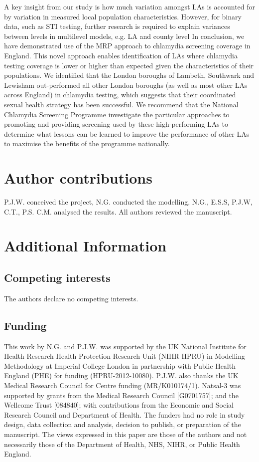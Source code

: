 \documentclass[fleqn,10pt]{wlscirep}
\begin{document}
A key insight from our study is how much variation amongst LAs is accounted for by variation in measured local population characteristics. However, for binary data, such as STI testing, further research is required to explain variances between levels in multilevel models, e.g. LA and county level \cite{Gelman2006}
In conclusion, we have demonstrated use of the MRP approach to chlamydia screening coverage in England. This novel approach enables identification of LAs where chlamydia testing coverage is lower or higher than expected given the characteristics of their populations. We identified that the London boroughs of Lambeth, Southwark and Lewisham out-performed all other London boroughs (as well as most other LAs across England) in chlamydia testing, which suggests that their coordinated sexual health strategy \cite{LSLstrategy2014,MEDFASH2008} has been successful. We recommend that the National Chlamydia Screening Programme investigate the particular approaches to promoting and providing screening used by these high-performing LAs to determine what lessons can be learned to improve the performance of other LAs to maximise the benefits of the programme nationally. 



\section*{Author contributions}
P.J.W. conceived the project, N.G. conducted the modelling, N.G., E.S.S, P.J.W, C.T., P.S. C.M. analysed the results. All authors reviewed the manuscript.

\section*{Additional Information}
\subsection*{Competing interests}
The authors declare no competing interests.

\subsection*{Funding}
This work by N.G. and P.J.W. was supported by the UK National Institute for Health Research Health Protection Research Unit (NIHR HPRU) in Modelling Methodology at Imperial College London in partnership with Public Health England (PHE) for funding (HPRU-2012-10080). P.J.W. also thanks the UK Medical Research Council for Centre funding (MR/K010174/1). Natsal-3 was supported by grants from the Medical Research Council [G0701757]; and the Wellcome Trust [084840]; with contributions from the Economic and Social Research Council and Department of Health.
The funders had no role in study design, data collection and analysis, decision to publish, or preparation of the manuscript. The views expressed in this paper are those of the authors and not necessarily those of the Department of Health, NHS, NIHR, or Public Health England. 
\end{document}
